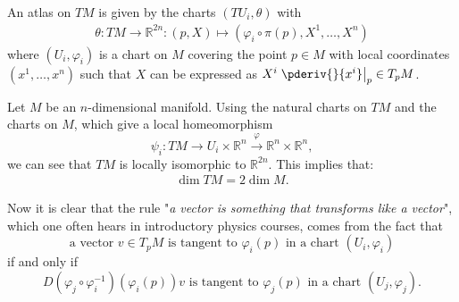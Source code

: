 

    \begin{property}
        An atlas on $TM$ is given by the charts $(TU_i, \theta)$ with
        \begin{gather}
            \theta:TM\rightarrow\mathbb{R}^{2n}:(p, X)\mapsto(\varphi_i\circ\pi(p),X^1,\ldots,X^n)
        \end{gather}
        where $(U_i, \varphi_i)$ is a chart on $M$ covering the point $p\in M$ with local coordinates $(x^1,\ldots,x^n)$ such that $X$ can be expressed as $X^i\left.\pderiv{}{x^i}\right|_p\in T_pM$.
    \end{property}

    \begin{property}[Dimension]
        Let $M$ be an $n$-dimensional manifold. Using the natural charts on $TM$ and the charts on $M$, which give a local homeomorphism \[\psi_i:TM\rightarrow U_i\times\mathbb{R}^n\xrightarrow{\varphi}\mathbb{R}^n\times\mathbb{R}^n,\] we can see that $TM$ is locally isomorphic to $\mathbb{R}^{2n}$. This implies that:
        \begin{gather}
            \dim TM = 2\dim M.
        \end{gather}
    \end{property}

    \begin{remark}
        Now it is clear that the rule "\textit{a vector is something that transforms like a vector}", which one often hears in introductory physics courses, comes from the fact that \[\text{a vector }v\in T_pM\text{ is tangent to }\varphi_i(p)\text{ in a chart }(U_i, \varphi_i)\] if and only if \[D(\varphi_j\circ\varphi_i^{-1})(\varphi_i(p))v\text{ is tangent to }\varphi_j(p)\text{ in a chart }(U_j, \varphi_j).\]
    \end{remark}

